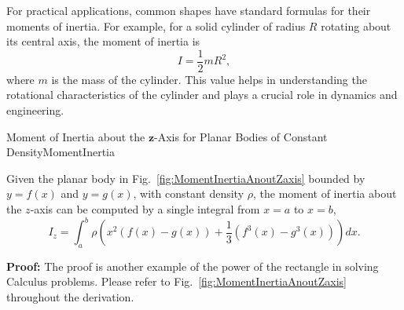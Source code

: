 For practical applications, common shapes have standard formulas for their moments of inertia. For example, for a solid cylinder of radius \( R \) rotating about its central axis, the moment of inertia is
\[
I = \frac{1}{2} mR^2,
\]
where \( m \) is the mass of the cylinder. This value helps in understanding the rotational characteristics of the cylinder and plays a crucial role in dynamics and engineering.
\\

\begin{propColor}{Moment of Inertia about the $\bm{z}$-Axis for Planar Bodies of Constant Density}{MomentInertia}

Given the planar body in Fig.~\ref{fig:MomentInertiaAnoutZaxis} bounded by \(y = f(x)\) and \(y = g(x)\), with constant density \(\rho\), the moment of inertia about the \(z\)-axis can be computed by a single integral from \(x = a\) to \(x = b\),
\begin{equation}
\label{eq:MomentInertiaAnoutZaxis}
 I_z = \int_a^b \rho \left( x^2(f(x) - g(x)) + \frac{1}{3} (f^3(x) - g^3(x)) \right) dx.   
\end{equation}
   
\end{propColor}

\textbf{Proof:} The proof is another example of the power of the rectangle in solving Calculus problems. Please refer to Fig.~\ref{fig:MomentInertiaAnoutZaxis} throughout the derivation.\\

